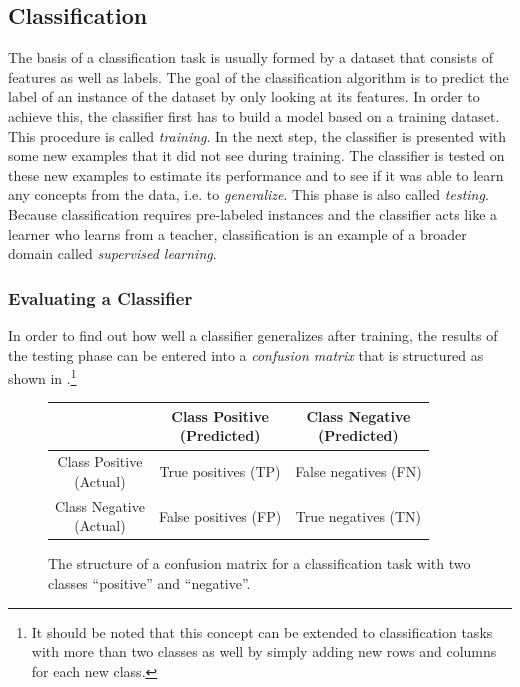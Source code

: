 \subsection{Classification}

The basis of a classification task is usually formed by a dataset that
consists of features as well as labels. The goal of the classification
algorithm is to predict the label of an instance of the dataset by
only looking at its features. In order to achieve this, the classifier
first has to build a model based on a training dataset. This procedure is called
\textit{training}. In the next step, the classifier is presented with
some new examples that it did not see during training. The classifier
is tested on these new examples to estimate its performance and to see
if it was able to learn any concepts from the data, i.e. to
\textit{generalize}. This phase is also
called \textit{testing}. Because classification requires pre-labeled
instances and the classifier acts like a learner who learns from a
teacher, classification is an example of a broader domain called
\textit{supervised learning}.

\subsubsection{Evaluating a Classifier}

In order to find out how well a classifier generalizes after training,
the results of the testing phase can be entered into a
\textit{confusion matrix} that is structured as shown in
.\footnote{It should be noted that this
  concept can be
  extended to classification tasks with more than two classes as well
  by simply adding new rows and columns for each new class.}
\begin{figure}[h]
  \centering
  \renewcommand\theadfont{\bfseries}
  \begin{tabular}{|c|c|c|}
    \hline
    & \thead{Class Positive\\(Predicted)} & \thead{Class Negative\\(Predicted)} \\
    \hline
    \thead{Class Positive\\(Actual)} & True positives (TP) & False
    negatives (FN) \\
    \hline
    \thead{Class Negative\\(Actual)} & False positives (FP) & True
    negatives (TN) \\
    \hline
  \end{tabular}
  \caption{The structure of a confusion matrix for a
    classification task with two classes ``positive'' and
    ``negative''.}
  \label{fig:confusion-matrix}
\end{figure}

